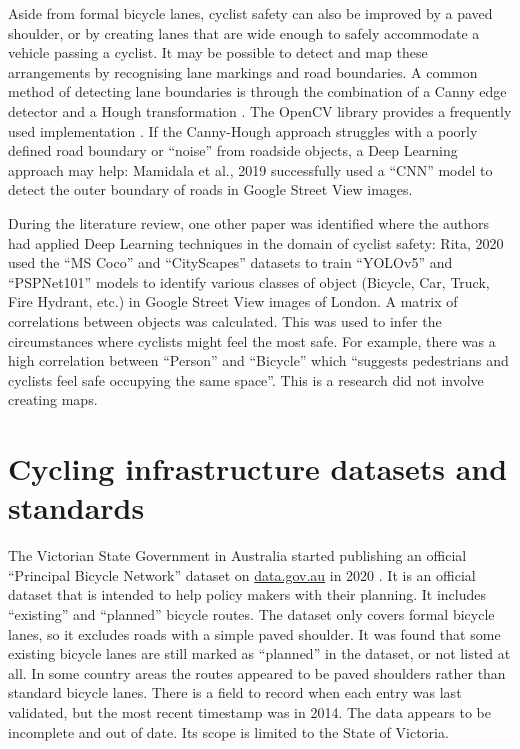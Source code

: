 \documentclass[11pt,twoside]{report}
\begin{document}
Aside from formal bicycle lanes, cyclist safety can also be improved by a paved shoulder, or by creating lanes that are wide enough to safely accommodate a vehicle passing a cyclist.  It may be possible to detect and map these arrangements by recognising lane markings and road boundaries.  A common method of detecting lane boundaries is through the combination of a Canny edge detector \cite{canny} and a Hough transformation \cite{hough}.  The OpenCV library provides a frequently used implementation \cite{opencv}.  If the Canny-Hough approach struggles with a poorly defined road boundary or ``noise'' from roadside objects, a Deep Learning approach may help:  Mamidala et al., 2019 \cite{8929655} successfully used a ``CNN'' model to detect the outer boundary of roads in Google Street View images.

During the literature review, one other paper was identified where the authors had applied Deep Learning techniques in the domain of cyclist safety:  Rita, 2020 \cite{rita_2020} used the ``MS Coco'' and ``CityScapes'' datasets to train ``YOLOv5'' and ``PSPNet101'' models to identify various classes of object (Bicycle, Car, Truck, Fire Hydrant, etc.) in Google Street View images of London.  A matrix of correlations between objects was calculated.  This was used to infer the circumstances where cyclists might feel the most safe.  For example, there was a high correlation between ``Person'' and ``Bicycle'' which ``suggests pedestrians and cyclists feel safe occupying the same space''.  This is a research did not involve creating maps.


\section{Cycling infrastructure datasets and standards}
\label{s:datasets}

The Victorian State Government in Australia started publishing an official ``Principal Bicycle Network'' dataset on \url{data.gov.au} in 2020 \cite{PrincipalBicycleNetwork}.  It is an official dataset that is intended to help policy makers with their planning.  It includes ``existing'' and ``planned'' bicycle routes.  The dataset only covers formal bicycle lanes, so it excludes roads with a simple paved shoulder.  It was found that some existing bicycle lanes are still marked as ``planned'' in the dataset, or not listed at all.  In some country areas the routes appeared to be paved shoulders rather than standard bicycle lanes.  There is a field to record when each entry was last validated, but the most recent timestamp was in 2014.  The data appears to be incomplete and out of date.  Its scope is limited to the State of Victoria.
\end{document}
